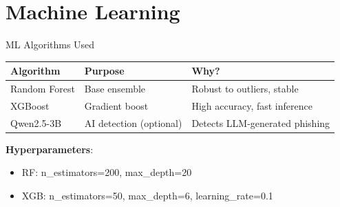 \documentclass[10pt, aspectratio=169]{beamer}
\begin{document}
\section{Machine Learning}

\begin{frame}{ML Algorithms Used}
    \begin{table}
        \centering
        \begin{tabular}{@{}lll@{}}
            \toprule
            Algorithm & Purpose & Why? \\
            \midrule
            Random Forest & Base ensemble & Robust to outliers, stable \\
            XGBoost & Gradient boost & High accuracy, fast inference \\
            Qwen2.5-3B & AI detection (optional) & Detects LLM-generated phishing \\
            \bottomrule
        \end{tabular}
    \end{table}
    
    \vspace{5mm}
    \textbf{Hyperparameters}:
    \begin{itemize}
        \item RF: n\_estimators=200, max\_depth=20
        \item XGB: n\_estimators=50, max\_depth=6, learning\_rate=0.1
    \end{itemize}
\end{frame}
\end{document}
